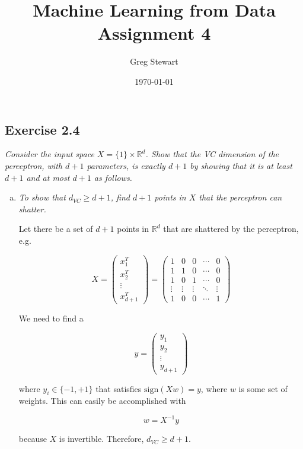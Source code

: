 \documentclass{article}
\title{Machine Learning from Data Assignment 4}
\author{Greg Stewart}
\date{\today}
\begin{document}
\maketitle

\subsection*{Exercise 2.4}

\textit{Consider the input space $X = \{1\}\times\mathbb{R}^d$. Show that the VC dimension
of the perceptron, with $d+1$ parameters, is exactly $d+1$ by showing that it is at least $d+1$ 
and at most $d+1$ as follows.}

\begin{enumerate}[(a)]
  \item \textit{To show that $d_{VC} \geq d+1$, find $d+1$ points in $X$ that the perceptron can
    shatter.}

    Let there be a set of $d+1$ points in $\mathbb{R}^d$ that are shattered by the perceptron, e.g.

    $$X =
      \begin{pmatrix}
        x_1^T \\
        x_2^T \\
        \vdots \\
        x_{d+1}^T
      \end{pmatrix}
      =
      \begin{pmatrix}
        1 & 0 & 0 & \cdots & 0 \\
        1 & 1 & 0 & \cdots & 0 \\
        1 & 0 & 1 & \cdots & 0 \\
        \vdots & \vdots & \vdots & \ddots & \vdots \\
        1 & 0 & 0 & \cdots & 1
      \end{pmatrix}
    $$

    We need to find a 

    $$ y =
      \begin{pmatrix}
        y_1 \\ y_2 \\ \vdots \\ y_{d+1}
      \end{pmatrix}
    $$

    where $y_i \in \{-1, +1\}$ that satisfies $\text{sign}(Xw) = y$, where $w$ is some set of weights.
    This can easily be accomplished with 

    $$ w = X^{-1}y$$

    because $X$ is invertible. Therefore, $d_{VC} \geq d+1$.
    

\end{enumerate}
\end{document}
